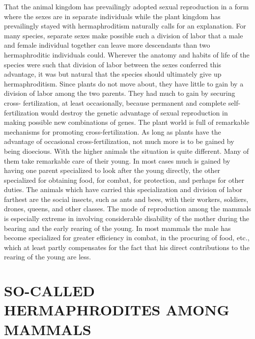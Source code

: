 That the animal kingdom has prevailingly adopted sexual reproduction
in a form where the sexes are in separate individuals while the
plant kingdom has prevailingly stayed with hermaphroditism naturally
calls for an explanation. For many species, separate sexes make possible
such a division of labor that a male and female individual together
can leave more descendants than two hermaphroditic individuals could.
Wherever the anatomy and habits of life of the species were such that
division of labor between the sexes conferred this advantage, it was but
natural that the species should ultimately give up hermaphroditism.
Since plants do not move about, they have little to gain by a division of
labor among the two parents. They had much to gain by securing cross-
fertilization, at least occasionally, because permanent and complete
self-fertilization would destroy the genetic advantage of sexual reproduction
in making possible new combinations of genes. The plant world is full
of remarkable mechanisms for promoting cross-fertilization. As long as
plants have the advantage of occasional cross-fertilization, not much
more is to be gained by being dioecious. With the higher animals the
situation is quite different. Many of them take remarkable care of their
young. In most cases much is gained by having one parent specialized
to look after the young directly, the other specialized for
obtaining food, for combat, for protection, and perhaps for other
duties. The animals which have carried this specialization and division
of labor farthest are the social insects, such as ants and bees, with their
workers, soldiers, drones, queens, and other classes. The mode of reproduction
among the mammals is especially extreme in involving considerable
disability of the mother during the bearing and the early rearing
of the young. In most mammals the male has become specialized for
greater efficiency in combat, in the procuring of food, etc., which at
least partly compensates for the fact that his direct contributions to the
rearing of the young are less.

\section*{SO-CALLED HERMAPHRODITES AMONG MAMMALS}

